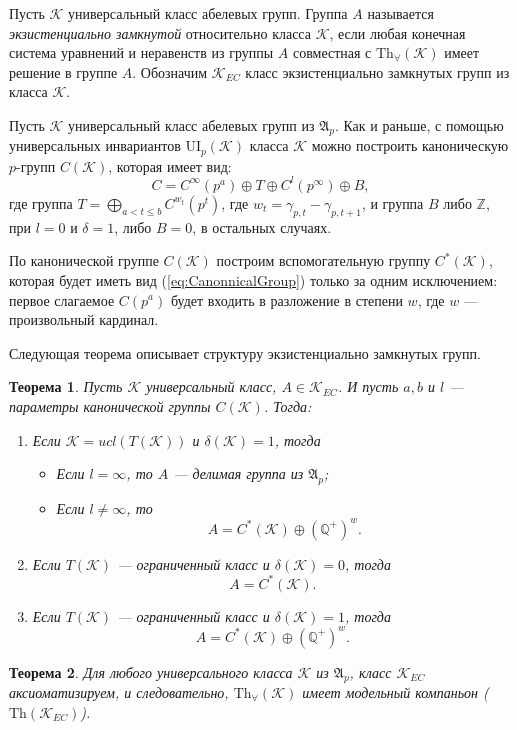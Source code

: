 \documentclass[14pt]{extarticle} %
\newtheorem{theorem}{Теорема}[section]
\def\proof{{\noindent{\bf Доказательство.}} }
\def\A{{\mathfrak{A}}}
\def\K{{\mathcal{K}}}
\def\Z{{\mathbb{Z}}}
\def\Q{{\mathbb{Q}}}
\def\Th{{\mathrm{Th}}}
\def\Tha{{\mathrm{Th}_\forall}}
\def\ui{{\mathrm{UI}}}
\begin{document}
Пусть $\K$ универсальный класс абелевых групп. Группа $A$ называется \textit{экзистенциально замкнутой} относительно класса $\K$, если любая конечная система уравнений и неравенств из группы $A$ совместная с $\Tha(\K)$ имеет решение в группе $A$. Обозначим $\K_{EC}$ класс экзистенциально замкнутых групп из класса $\K$.

Пусть $\K$ универсальный класс абелевых групп из $\A_p$. Как и раньше, с помощью универсальных инвариантов $\ui_p(\K)$ класса $\K$ можно построить каноническую $p$-групп $C(\K)$, которая имеет вид:
\begin{equation}\label{eq:CanonnicalGroup}
 C = C^\infty(p^a) \oplus T \oplus C^l(p^\infty) \oplus B,
 \end{equation}
где группа $T = \bigoplus\limits_{ a < t \leq b} C^{w_t}(p^t)$, где $w_t = \gamma_{p,t} - \gamma_{p,t+1}$, и группа $B$ либо $\Z$, при $l = 0$ и $\delta = 1$, либо $B = 0$, в остальных случаях.

По канонической группе $C(\K)$ построим вспомогательную группу $C^*(\K)$, которая будет иметь вид (\ref{eq:CanonnicalGroup}) только за одним исключением: первое слагаемое $C(p^a)$ будет входить в разложение в степени $w$, где $w$ --- произвольный кардинал.

Следующая теорема описывает структуру экзистенциально замкнутых групп.
\begin{theorem}
Пусть $\K$ универсальный класс, $A \in \K_{EC}$. И пусть $a, b$ и $l$ --- параметры канонической группы $C(\K)$. Тогда:
\begin{enumerate}
\item Если $\K = ucl(T(\K))$ и $\delta(\K) = 1$, тогда
\begin{itemize}
\item Если $l = \infty$, то $A$ --- делимая группа из $\A_p$;
\item Если $l \neq \infty$, то
$$A = C^*(\K) \oplus (\Q^+)^w.$$
\end{itemize}
\item Если $T(\K)$ --- ограниченный класс и $\delta(\K) = 0$, тогда
$$A = C^*(\K).$$
\item Если $T(\K)$ --- ограниченный класс и $\delta(\K) = 1$, тогда
$$A = C^*(\K) \oplus (\Q^+)^w.$$
\end{enumerate}
\end{theorem}

\proof {}

\begin{theorem}
Для любого универсального класса $\K$ из $\A_p$, класс $\K_{EC}$ аксиоматизируем, и следовательно, $\Tha(\K)$ имеет модельный компаньон ($\Th(\K_{EC})$).
\end{theorem}
\end{document}
